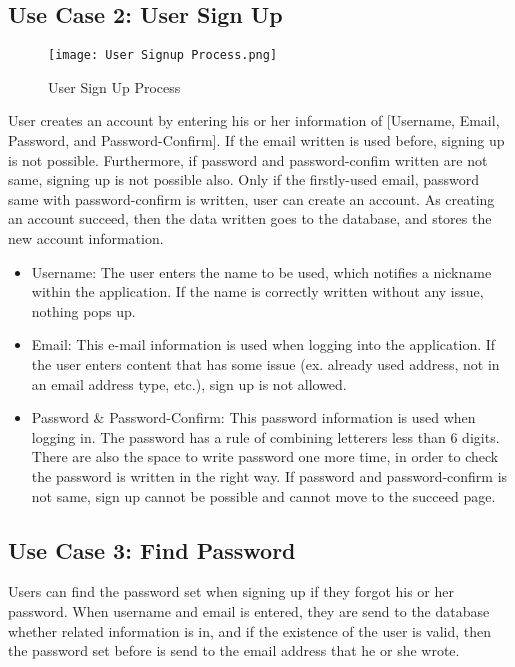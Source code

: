 \documentclass[conference]{IEEEtran}
\begin{document}
\subsection{Use Case 2: User Sign Up}
    \begin{figure}[htbp]
    \centerline{\texttt{[image: User Signup Process.png]}}
    \label{fig}
    \caption{User Sign Up Process}
    \end{figure}
User creates an account by entering his or her information of [Username, Email, Password, and Password-Confirm]. If the email written is used before, signing up is not possible. Furthermore, if password and password-confim written are not same, signing up is not possible also. Only if the firstly-used email, password same with password-confirm is written, user can create an account. As creating an account succeed, then the data written goes to the database, and stores the new account information.\\
\begin{itemize}
    \item Username: The user enters the name to be used, which notifies a nickname within the application. If the name is correctly written without any issue, nothing pops up.
    \item Email: This e-mail information is used when logging into the application. If the user enters content that has some issue (ex. already used address, not in an email address type, etc.), sign up is not allowed.
    \item Password & Password-Confirm: This password information is used when logging in. The password has a rule of combining letterers less than 6 digits. There are also the space to write password one more time, in order to check the password is written in the right way. If password and password-confirm is not same, sign up cannot be possible and cannot move to the succeed page.\\
\end{itemize}
    
\subsection{Use Case 3: Find Password}
Users can find the password set when signing up if they forgot his or her password. When username and email is entered, they are send to the database whether related information is in, and if the existence of the user is valid, then the password set before is send to the email address that he or she wrote.\\
\end{document}
